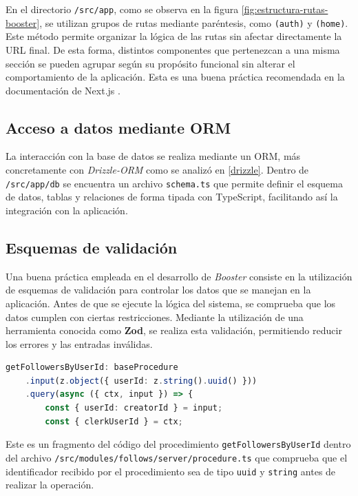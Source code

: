 En el directorio \texttt{/src/app}, como se observa en la figura \ref{fig:estructura-rutas-booster}, se utilizan grupos de rutas mediante paréntesis, como \texttt{(auth)} y \texttt{(home)}. Este método permite organizar la lógica de las rutas sin afectar directamente la URL final. De esta forma, distintos componentes que pertenezcan a una misma sección se pueden agrupar según su propósito funcional sin alterar el comportamiento de la aplicación. Esta es una buena práctica recomendada en la documentación de Next.js \cite{nextjs-parenthesis}.


\subsection{Acceso a datos mediante ORM}

La interacción con la base de datos se realiza mediante un ORM, más concretamente con \textit{Drizzle-ORM} como se analizó en \ref{drizzle}. Dentro de \texttt{/src/app/db} se encuentra un archivo \texttt{schema.ts} que permite definir el esquema de datos, tablas y relaciones de forma tipada con TypeScript, facilitando así la integración con la aplicación.

\subsection{Esquemas de validación}

Una buena práctica empleada en el desarrollo de \textit{Booster} consiste en la utilización de esquemas de validación para controlar los datos que se manejan en la aplicación. Antes de que se ejecute la lógica del sistema, se comprueba que los datos cumplen con ciertas restricciones. Mediante la utilización de una herramienta conocida como \textbf{Zod}, se realiza esta validación, permitiendo reducir los errores y las entradas inválidas. 

\begin{lstlisting}[language=TypeScript]
 getFollowersByUserId: baseProcedure
    .input(z.object({ userId: z.string().uuid() }))
    .query(async ({ ctx, input }) => {
        const { userId: creatorId } = input;
        const { clerkUserId } = ctx;


\end{lstlisting}

Este es un fragmento del código del procedimiento \texttt{getFollowersByUserId} dentro del archivo \texttt{/src/modules/follows/server/procedure.ts} que comprueba que el identificador recibido por el procedimiento sea de tipo \texttt{uuid} y \texttt{string} antes de realizar la operación. 

